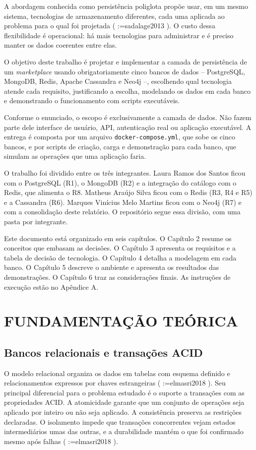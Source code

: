 \documentclass[12pt,a4paper,oneside]{article}
\makeatletter
\newcommand{\PessoaUm}{Laura Ramos dos Santos}
\newcommand{\PessoaDois}{Matheus Araújo Silva}
\newcommand{\PessoaTres}{Marques Vinícius Melo Martins}
\newcommand{\tys@getpar}[1]{%
  \@ifundefined{cite@#1}{\textbf{??#1??}}{\@nameuse{cite@#1}}%
}
\newif\iftysfirst
\newcommand{\tys@listpar}[1]{%
  \tysfirsttrue
  \@for\tys@key:=#1\do{%
    \iftysfirst\tysfirstfalse\else; \fi
    \expandafter\tys@getpar\expandafter{\tys@key}%
  }%
}
\renewcommand{\cite}[1]{(\tys@listpar{#1})}
\makeatother
\begin{document}
A abordagem conhecida como persistência poliglota propõe usar, em um mesmo sistema, tecnologias de armazenamento diferentes, cada uma aplicada ao problema para o qual foi projetada \cite{sadalage2013}. O custo dessa flexibilidade é operacional: há mais tecnologias para administrar e é preciso manter os dados coerentes entre elas.

O objetivo deste trabalho é projetar e implementar a camada de persistência de um \textit{marketplace} usando obrigatoriamente cinco bancos de dados -- PostgreSQL, MongoDB, Redis, Apache Cassandra e Neo4j --, escolhendo qual tecnologia atende cada requisito, justificando a escolha, modelando os dados em cada banco e demonstrando o funcionamento com scripts executáveis.

Conforme o enunciado, o escopo é exclusivamente a camada de dados. Não fazem parte dele interface de usuário, API, autenticação real ou aplicação executável. A entrega é composta por um arquivo \texttt{docker-compose.yml}, que sobe os cinco bancos, e por scripts de criação, carga e demonstração para cada banco, que simulam as operações que uma aplicação faria.

O trabalho foi dividido entre os três integrantes. \PessoaUm{} ficou com o PostgreSQL (R1), o MongoDB (R2) e a integração do catálogo com o Redis, que alimenta o R8. \PessoaDois{} ficou com o Redis (R3, R4 e R5) e a Cassandra (R6). \PessoaTres{} ficou com o Neo4j (R7) e com a consolidação deste relatório. O repositório segue essa divisão, com uma pasta por integrante.

Este documento está organizado em seis capítulos. O Capítulo 2 resume os conceitos que embasam as decisões. O Capítulo 3 apresenta os requisitos e a tabela de decisão de tecnologia. O Capítulo 4 detalha a modelagem em cada banco. O Capítulo 5 descreve o ambiente e apresenta os resultados das demonstrações. O Capítulo 6 traz as considerações finais. As instruções de execução estão no Apêndice A.

\section{FUNDAMENTAÇÃO TEÓRICA}

\subsection{Bancos relacionais e transações ACID}

O modelo relacional organiza os dados em tabelas com esquema definido e relacionamentos expressos por chaves estrangeiras \cite{elmasri2018}. Seu principal diferencial para o problema estudado é o suporte a transações com as propriedades ACID. A atomicidade garante que um conjunto de operações seja aplicado por inteiro ou não seja aplicado. A consistência preserva as restrições declaradas. O isolamento impede que transações concorrentes vejam estados intermediários umas das outras, e a durabilidade mantém o que foi confirmado mesmo após falhas \cite{elmasri2018}.
\end{document}
